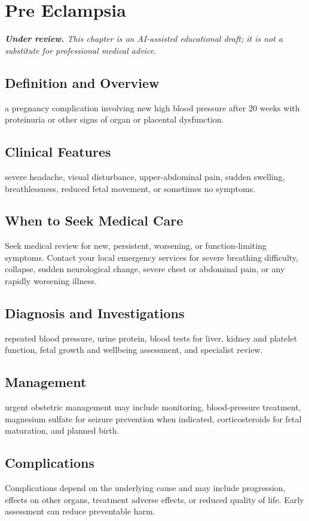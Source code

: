 \chapter{Pre Eclampsia}

\medskip
\noindent\textit{\textbf{Under review.} This chapter is an AI-assisted educational draft; it is not a substitute for professional medical advice.}

\section*{Definition and Overview}
a pregnancy complication involving new high blood pressure after 20 weeks with proteinuria or other signs of organ or placental dysfunction.

\section*{Clinical Features}
severe headache, visual disturbance, upper-abdominal pain, sudden swelling, breathlessness, reduced fetal movement, or sometimes no symptoms.

\section*{When to Seek Medical Care}
Seek medical review for new, persistent, worsening, or function-limiting symptoms. Contact your local emergency services for severe breathing difficulty, collapse, sudden neurological change, severe chest or abdominal pain, or any rapidly worsening illness.

\section*{Diagnosis and Investigations}
repeated blood pressure, urine protein, blood tests for liver, kidney and platelet function, fetal growth and wellbeing assessment, and specialist review.

\section*{Management}
urgent obstetric management may include monitoring, blood-pressure treatment, magnesium sulfate for seizure prevention when indicated, corticosteroids for fetal maturation, and planned birth.

\section*{Complications}
Complications depend on the underlying cause and may include progression, effects on other organs, treatment adverse effects, or reduced quality of life. Early assessment can reduce preventable harm.

